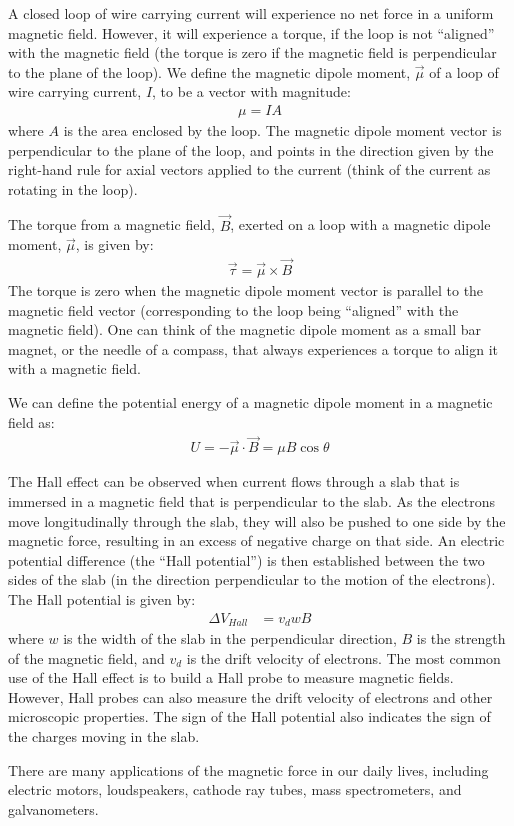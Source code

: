 \begin{chapterSummary}
A closed loop of wire carrying current will experience no net force in a uniform magnetic field. However, it will experience a torque, if the loop is not ``aligned'' with the magnetic field (the torque is zero if the magnetic field is perpendicular to the plane of the loop). We define the magnetic dipole moment, $\vec \mu$ of a loop of wire carrying current, $I$, to be a vector with magnitude:
\begin{align*}
\mu = IA
\end{align*}
where $A$ is the area enclosed by the loop. The magnetic dipole moment vector is perpendicular to the plane of the loop, and points in the direction given by the right-hand rule for axial vectors applied to the current (think of the current as rotating in the loop).

The torque from a magnetic field, $\vec B$, exerted on a loop with a magnetic dipole moment, $\vec \mu$, is given by:
\begin{align*}
\vec \tau = \vec \mu \times \vec B
\end{align*}
The torque is zero when the magnetic dipole moment vector is parallel to the magnetic field vector (corresponding to the loop being ``aligned'' with the magnetic field). One can think of the magnetic dipole moment as a small bar magnet, or the needle of a compass, that always experiences a torque to align it with a magnetic field.

We can define the potential energy of a magnetic dipole moment in a magnetic field as:
\begin{align*}
U= -\vec \mu \cdot \vec B = \mu B \cos\theta
\end{align*}

The Hall effect can be observed when current flows through a slab that is immersed in a magnetic field that is perpendicular to the slab. As the electrons move longitudinally through the slab, they will also be pushed to one side by the magnetic force, resulting in an excess of negative charge on that side. An electric potential difference (the ``Hall potential'') is then established between the two sides of the slab (in the direction perpendicular to the motion of the electrons). The Hall potential is given by:
\begin{align*}
\Delta V_{Hall}&= v_d wB
\end{align*}
where $w$ is the width of the slab in the perpendicular direction, $B$ is the strength of the magnetic field, and $v_d$ is the drift velocity of electrons. The most common use of the Hall effect is to build a Hall probe to measure magnetic fields. However, Hall probes can also measure the drift velocity of electrons and other microscopic properties. The sign of the Hall potential also indicates the sign of the charges moving in the slab.

There are many applications of the magnetic force in our daily lives, including electric motors, loudspeakers, cathode ray tubes, mass spectrometers, and galvanometers.

\end{chapterSummary}

